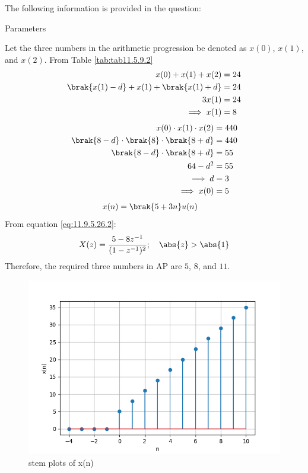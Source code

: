 \documentclass[journal,12pt,twocolumn]{IEEEtran}
\theoremstyle{remark}
\begin{document}
\solution
\fi
The following information is provided in the question:
\begin{table}[h]
 	\centering
 	\resizebox{6 cm}{!}{
 		
 	}
 	\vspace{6 pt}
 	\caption{Parameters}
 	\label{tab:tab11.5.9.2} 
 \end{table}
\newline
Let the three numbers in the arithmetic progression be denoted as $x(0)$, $x(1)$, and $x(2)$.
\newline
From Table \ref{tab:tab11.5.9.2}
\begin{align}
  x(0) + x(1) + x(2) &= 24 \\
   \brak{x(1) - d} + x(1) + \brak{x(1) + d} &= 24 \\
    3x(1) &= 24 \\ 
   \implies x(1) &= 8 
\end{align}
\begin{align}
   x(0) \cdot x(1) \cdot x(2) &= 440  \\
 \brak{8-d} \cdot \brak{8} \cdot \brak{8+d} &= 440  \\
 \brak{8-d} \cdot \brak{8+d} &= 55 \\
 64-d^2 &= 55 \\
  \implies d &= 3 \\
  \implies x(0) &= 5
\end{align}
\begin{align}
     x(n) &= \brak{5 + 3n}u(n)  
 \end{align}
 From equation \eqref{eq:11.9.5.26.2}:  
\begin{align}      
  X(z) = \frac{5 - 8z^{-1}}{(1-z^{-1})^2} ; \quad \abs{z} > \abs{1}  
\end{align}
Therefore, the required three numbers in AP are $5$, $8$, and $11$.
\begin{figure}[h!]
  \centering
  \includegraphics[width=\columnwidth]{ncert-maths/11/5/9/2/figs/stem_plot.png} 
  \caption{stem plots of x(n)}
\end{figure}
\end{document}
